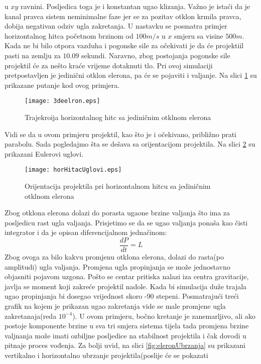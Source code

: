 u $xy$ ravnini. Posljedica toga je i konstantan ugao klizanja. Važno je istaći da je kanal pravca 
sistem neminimalne faze jer se za pozitav otklon krmila pravca, dobija negativan odziv ugla zakretanja. 
U nastavku se posmatra primjer horizontalnog hitca početnom brzinom od $100m/s$ u $x$ smjeru
sa visine $500m$. Kada ne bi bilo otpora vazduha i pogonske sile za očekivati je da će projektiil pasti na zemlju 
za $10.09$ sekundi. Naravno, zbog postojanja pogonske sile projektil će za nešto kraće vrijeme 
dotaknuti tlo. Pri ovoj simulaciji pretpostavljen je jedinični otklon elerona, pa će se pojaviti i valjanje. 
Na slici \ref{fig:eleronPutanja} su prikazane putanje kod ovog primjera. 
\begin{figure}[!ht]
    \centering
    \texttt{[image: 3deelron.eps]}
    \caption{Trajekroija horizontalnog hitc sa jediničnim otklnom elerona}
    \label{fig:eleronPutanja}
\end{figure}
Vidi se da u ovom primjeru projektil, kao što je i očekivano, približno prati parabolu. 
Sada pogledajmo šta se dešava sa orijentacijom projektila. Na slici \ref{fig:orijentacijaEleron}
su prikazani Eulerovi uglovi. 
\begin{figure}[!ht]
    \centering
    \texttt{[image: horHitacUglovi.eps]}
    \caption{Orijentacija projektila pri horizontalnom hitcu sa jediničnim otklnom elerona}
    \label{fig:orijentacijaEleron}
\end{figure}
Zbog otklona elerona dolazi do porasta ugaone brzine valjanja što ima za posljedicu 
rast ugla valjanja. Prisjetimo se da se ugao valjanja ponaša kao čisti integrator i da je 
opisan diferencijalnom jednačinom:
\begin{equation*}
    \frac{dP}{dt} = L
\end{equation*}
Zbog ovoga za bilo kakvu promjenu otklona elerona, dolazi do rasta(po amplitudi) ugla valjanja. 
Promjena ugla propinjanja se može jednostavno objasniti pojavom uzgona. Pošto se centar pritiska nalazi 
iza centra gravitacije, javlja se moment koji zakreće projektil nadole. Kada bi simulacija duže trajala 
ugao propinjanja bi dosegao vrijednost skoro -90 stepeni. Posmatrajući treći grafik na kojem 
je prikazan ugao zakretanja vide se male promjene ugla zakretanaja(reda $10^{-4}$). U ovom primjeru,
bočno kretanje je zanemarljivo, ali ako postoje komponente brzine u sva tri smjera sistema tijela tada 
promjena brzine valjnanja može imati ozbiljne posljedice na stabilnost projektila i čak dovodi u pitnaje proces vođenja.
Za bolji uvid, na slici \ref{fig:eleronUbrzanja} su prikazani vertikalno i horizontalno ubrzanje projektila(poslije će se pokazati 
